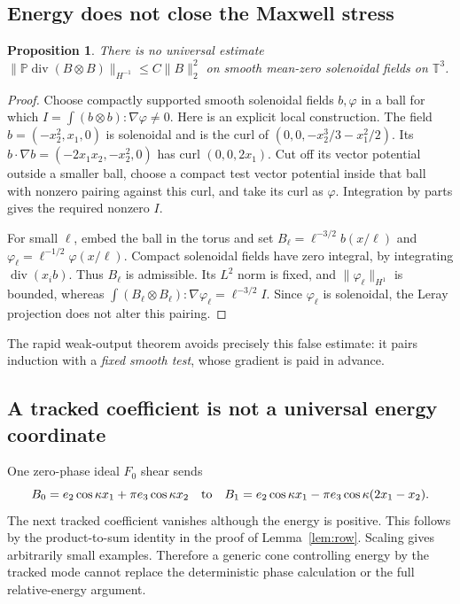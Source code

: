 \documentclass[11pt,a4paper]{amsart}
\newtheorem{proposition}[theorem]{Proposition}
\theoremstyle{definition}
\theoremstyle{remark}
\numberwithin{equation}{section}
\newcommand{\T}{\mathbb T}
\newcommand{\PP}{\mathbb P}
\newcommand{\norm}[1]{\lVert #1\rVert}
\newcommand{\diver}{\operatorname{div}}
\begin{document}
\subsection{Energy does not close the Maxwell stress}
\begin{proposition}\label{prop:stress}
There is no universal estimate
$\norm{\PP\diver(B\otimes B)}_{H^{-1}}\le C\norm B_2^2$
on smooth mean-zero solenoidal fields on $\T^3$.
\end{proposition}

\begin{proof}
Choose compactly supported smooth solenoidal fields $b,\varphi$ in a ball for which
$I=\int(b\otimes b):\nabla\varphi\ne0$. Here is an explicit local construction. The field $b=(-x_2^2,x_1,0)$ is solenoidal and is the curl of $(0,0,-x_2^3/3-x_1^2/2)$. Its $b\cdot\nabla b=(-2x_1x_2,-x_2^2,0)$ has curl $(0,0,2x_1)$. Cut off its vector potential outside a smaller ball, choose a compact test vector potential inside that ball with nonzero pairing against this curl, and take its curl as $\varphi$. Integration by parts gives the required nonzero $I$.

For small $\ell$, embed the ball in the torus and set
$B_\ell=\ell^{-3/2}b(x/\ell)$ and
$\varphi_\ell=\ell^{-1/2}\varphi(x/\ell)$. Compact solenoidal fields have zero integral, by integrating $\diver(x_i b)$. Thus $B_\ell$ is admissible. Its $L^2$ norm is fixed, and $\norm{\varphi_\ell}_{H^1}$ is bounded, whereas
$\int(B_\ell\otimes B_\ell):\nabla\varphi_\ell
=\ell^{-3/2}I$. Since $\varphi_\ell$ is solenoidal, the Leray projection does not alter this pairing.
\end{proof}

The rapid weak-output theorem avoids precisely this false estimate: it pairs induction with a \emph{fixed smooth test}, whose gradient is paid in advance.

\subsection{A tracked coefficient is not a universal energy coordinate}
One zero-phase ideal $F_0$ shear sends
\[
 B_0=e_2\cos\kappa x_1+\pi e_3\cos\kappa x_2
 \quad\hbox{to}\quad
 B_1=e_2\cos\kappa x_1-\pi e_3\cos\kappa(2x_1-x_2).
\]
The next tracked coefficient vanishes although the energy is positive. This follows by the product-to-sum identity in the proof of Lemma~\ref{lem:row}. Scaling gives arbitrarily small examples. Therefore a generic cone controlling energy by the tracked mode cannot replace the deterministic phase calculation or the full relative-energy argument.
\end{document}
